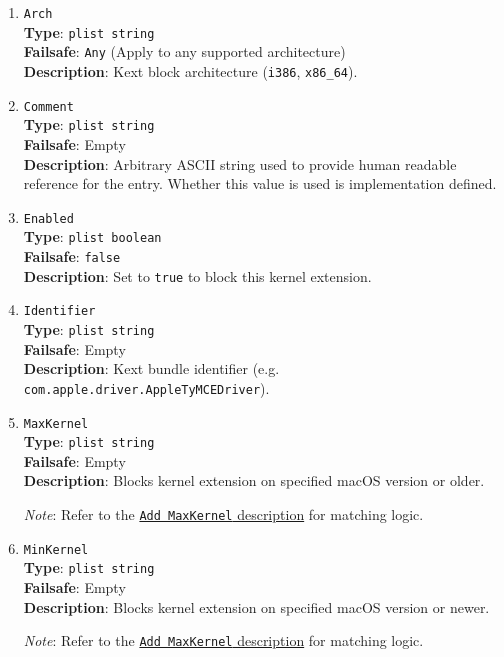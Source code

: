 \documentclass[]{article}
\begin{document}
\begin{enumerate}
\item
  \texttt{Arch}\\
  \textbf{Type}: \texttt{plist\ string}\\
  \textbf{Failsafe}: \texttt{Any} (Apply to any supported architecture)\\
  \textbf{Description}: Kext block architecture (\texttt{i386}, \texttt{x86\_64}).

\item
  \texttt{Comment}\\
  \textbf{Type}: \texttt{plist\ string}\\
  \textbf{Failsafe}: Empty\\
  \textbf{Description}: Arbitrary ASCII string used to provide human readable
  reference for the entry. Whether this value is used is implementation defined.

\item
  \texttt{Enabled}\\
  \textbf{Type}: \texttt{plist\ boolean}\\
  \textbf{Failsafe}: \texttt{false}\\
  \textbf{Description}: Set to \texttt{true} to block this kernel extension.

\item
  \texttt{Identifier}\\
  \textbf{Type}: \texttt{plist\ string}\\
  \textbf{Failsafe}: Empty\\
  \textbf{Description}: Kext bundle identifier
    (e.g. \texttt{com.apple.driver.AppleTyMCEDriver}).

\item
  \texttt{MaxKernel}\\
  \textbf{Type}: \texttt{plist\ string}\\
  \textbf{Failsafe}: Empty\\
  \textbf{Description}: Blocks kernel extension on specified macOS version or older.

  \emph{Note}: Refer to the \hyperlink{kernmatch}{\texttt{Add\ MaxKernel} description} for matching logic.

\item
  \texttt{MinKernel}\\
  \textbf{Type}: \texttt{plist\ string}\\
  \textbf{Failsafe}: Empty\\
  \textbf{Description}: Blocks kernel extension on specified macOS version or newer.

  \emph{Note}: Refer to the \hyperlink{kernmatch}{\texttt{Add\ MaxKernel} description} for matching logic.

\end{enumerate}
\end{document}
